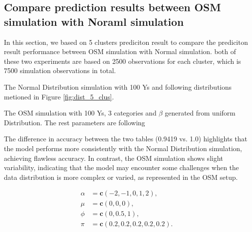 \documentclass{article}
\begin{document}

\clearpage

\subsection{Compare prediction results between OSM simulation with Noraml simulation}

In this section, we based on 5 clusters prediciton result to compare the prediciton result performance between OSM simulation with Normal simulation.
both of these two experiments are based on 2500 observations for each cluster, which is 7500 simulation observations in total. 

The Normal Distribution simulation with 100 Ys and following distributions metioned in Figure \ref{fig:dist_5_clus}.

The OSM simulation with 100 Ys, 3 categories and $\beta$ generated from uniform Distribution. The rest parameters are following

The difference in accuracy between the two tables (0.9419 vs. 1.0) highlights that the model performs more consistently with the Normal Distribution simulation, achieving flawless accuracy. 
In contrast, the OSM simulation shows slight variability, indicating that the model may encounter some challenges when the data distribution is more complex or varied, as represented in the OSM setup.

\[
\begin{aligned}
\alpha &= \mathbf{c}(-2, -1, 0, 1, 2), \\
\mu &= \mathbf{c}(0, 0, 0), \\
\phi &= \mathbf{c}(0, 0.5, 1), \\
\pi &= \mathbf{c}(0.2, 0.2, 0.2, 0.2, 0.2).
\end{aligned}
\]
\end{document}
